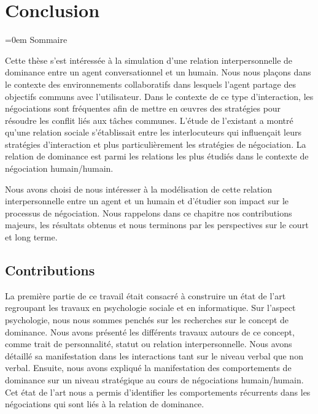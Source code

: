 \chapter{Conclusion}

\begingroup
\parindent=0em
\large Sommaire
\localtableofcontents 
\clearpage
\endgroup

Cette thèse s'est intéressée à la simulation d'une relation interpersonnelle de dominance entre un agent conversationnel et un humain.
Nous nous plaçons dans le contexte des environnements collaboratifs dans lesquels l'agent partage des objectifs communs avec l'utilisateur. Dans le contexte de ce type d'interaction, les négociations sont fréquentes afin de mettre en œuvres des stratégies pour résoudre les conflit liés aux tâches communes. 
L'étude de l'existant a montré qu'une relation sociale s'établissait entre les interlocuteurs qui influençait leurs stratégies d'interaction et plus particulièrement les stratégies de négociation. La relation de dominance est parmi les relations les plus étudiés dans le contexte de négociation humain/humain. 

Nous avons choisi de nous intéresser à la modélisation de cette relation interpersonnelle entre un agent et un humain et d'étudier son impact sur le processus de négociation.  Nous rappelons dans ce chapitre nos contributions majeurs, les résultats obtenus et nous terminons par les perspectives sur le court et long terme. 

 
\section{Contributions}
	La première partie de ce travail était consacré à construire un état de l'art regroupant les travaux en psychologie sociale et en informatique.  Sur l'aspect psychologie, nous nous sommes penchés sur les recherches sur le concept de dominance. Nous avons présenté les différents travaux autours de ce concept, comme trait de personnalité, statut ou relation interpersonnelle.
	Nous avons détaillé sa manifestation dans les interactions tant sur le niveau verbal que non verbal. Ensuite, nous avons expliqué la manifestation des comportements de dominance sur un niveau stratégique au cours de négociations humain/humain.
	Cet état de l'art nous a permis d'identifier les comportements récurrents dans les négociations qui sont liés à la relation de dominance.
	
